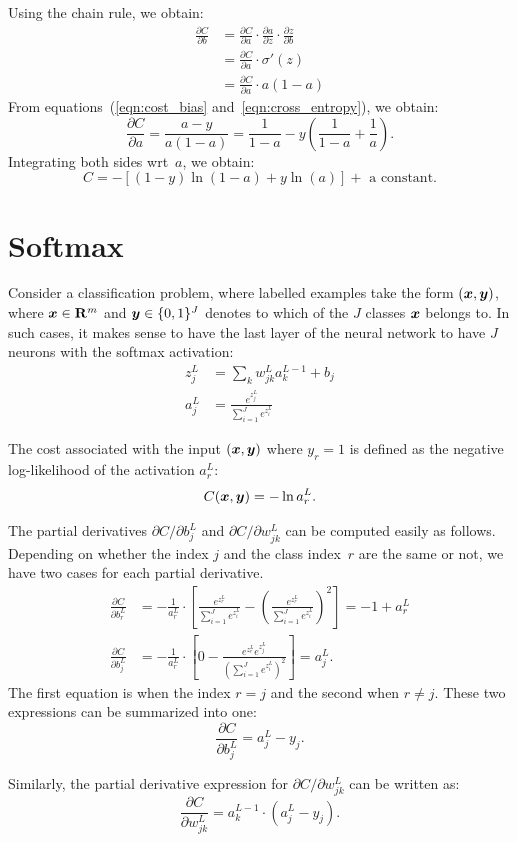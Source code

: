 Using the chain rule, we obtain:
\begin{align}
    \frac{\partial C}{\partial b} & = 
        \frac{\partial C}{\partial a} \cdot 
        \frac{\partial a}{\partial z} \cdot 
        \frac{\partial z}{\partial b} \nonumber \\
        & = \frac{\partial C}{\partial a} \cdot \sigma'(z) \nonumber \\ 
        & = \frac{\partial C}{\partial a} \cdot a (1 - a) \label{eqn:cross_entropy} 
\end{align}
From equations~(\ref{eqn:cost_bias} and~\ref{eqn:cross_entropy}), we obtain:
\[
    \frac{\partial C}{\partial a} = \frac{a - y}{a (1 - a)} = 
        \frac{1}{1 - a} - y \left ( \frac{1}{1 - a} + \frac{1}{a}\right ).
\]
Integrating both sides wrt~$a$, we obtain:
\[
    C = - [(1 - y) \ln (1 - a) + y \ln (a)] + \text{ a constant}.
\]

\section{Softmax}

Consider a classification problem, where labelled examples take the form 
$(\boldsymbol{x}, \boldsymbol{y})$, where $\boldsymbol{x} \in \mathbf{R}^m$ and $\boldsymbol{y} \in \{0, 1\}^J$ 
denotes to which of the $J$ classes $\boldsymbol{x}$ belongs to. 
In such cases, it makes sense to have the last 
layer of the neural network to have $J$ neurons with the softmax activation:
\begin{align*}
    z_j^L & = \sum_k w_{j k}^L a_{k}^{L - 1} + b_j \\
    a_j^L & = \frac{e^{z_j^L}}{ \sum_{i = 1}^J e^{z_i^L}}
\end{align*}

The cost associated with the input $(\boldsymbol{x}, \boldsymbol{y})$ where $y_r = 1$ 
is defined as the negative log-likelihood of the activation $a_{r}^L$:
\[
    C(\boldsymbol{x}, \boldsymbol{y}) = - \ln a_{r}^L.
\]

The partial derivatives $\partial C / \partial b_j^L$ and   $\partial C / \partial w_{j k}^L$
can be computed easily as follows. Depending on whether the index $j$ and the class index~$r$
are the same or not, we have two cases for each partial derivative.
\begin{align}
    \frac{\partial C}{\partial b_{r}^L} 
        & =   - \frac{1}{a_{r}^L} \cdot 
            \left [ \frac{e^{z_{r}^L}}{ \sum_{i = 1}^J e^{z_i^L}} - 
                    \left ( \frac{e^{z_{r}^L}}{ \sum_{i = 1}^J e^{z_i^L}} \right )^2 
            \right ] = - 1 + a_{r}^L \\
\frac{\partial C}{\partial b_j^L} 
      & = 
    - \frac{1}{a_{r}^L} \cdot \left [ 0 - \frac{e^{z_{r}^L} e^{z_j^L}}{ \left ( \sum_{i = 1}^J e^{z_i^L} \right )^2} 
                            \right ] = a_j^L. 
\end{align}
The first equation is when the index $r = j$ and the second when $r \neq j$. 
These two expressions can be summarized into one: 
\begin{equation}
\frac{\partial C}{\partial b_j^L} = a_{j}^L - y_j.
\end{equation}

Similarly, the partial derivative expression for  $\partial C / \partial w_{j k}^L$
can be written as:
\begin{equation}
\frac{\partial C}{\partial w_{j k}^L} = a_{k}^{L - 1} \cdot (a_{j}^L - y_j). 
\end{equation}

